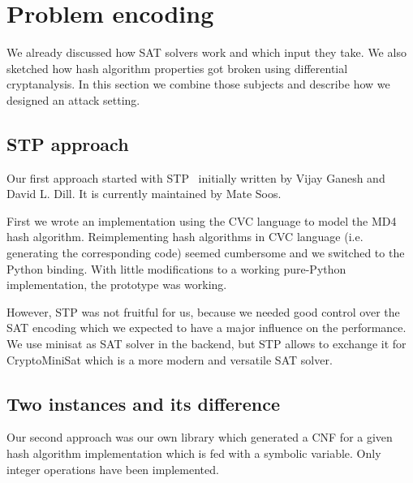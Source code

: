 \renewcommand*\chappic{img/encoding.pdf}
\renewcommand*\chapquote{There is concensus that encoding techniques usually have a dramatic impact on the efficiency of the SAT solver}
\renewcommand*\chapquotesrc{Magnus Bj\"ork}
\chapter{Problem encoding}
\label{ch:enc}

We already discussed how SAT solvers work and which input they take.
We also sketched how hash algorithm properties got broken using
differential cryptanalysis. In this section we combine those
subjects and describe how we designed an attack setting.

\section{STP approach}
\label{sec:enc-stp}
%
Our first approach started with STP~\cite{stp} initially written by Vijay Ganesh and David L. Dill.
It is currently maintained by Mate Soos.

First we wrote an implementation using the CVC language to model the MD4 hash algorithm.
Reimplementing hash algorithms in CVC language (i.e. generating the corresponding code)
seemed cumbersome and we switched to the Python binding. With little modifications to
a working pure-Python implementation, the prototype was working.

However, STP was not fruitful for us, because we needed good control over the SAT encoding
which we expected to have a major influence on the performance. We use minisat as SAT solver
in the backend, but STP allows to exchange it for CryptoMiniSat which is a more modern and
versatile SAT solver.

\section{Two instances and its difference}
\label{sec:enc-algotocnf}
%
Our second approach was our own library which generated a CNF for a given hash algorithm
implementation which is fed with a symbolic variable. Only integer operations have been
implemented.


